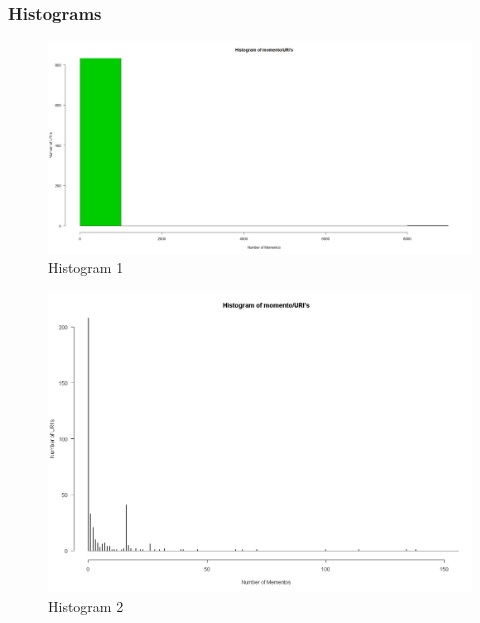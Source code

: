\subsubsection{Histograms}
\begin{figure}[ht]    
    \begin{center}
        \includegraphics[scale=0.27]{histgora_bscale.png}
        \caption{Histogram 1}
        \label{Histogram 1}
    \end{center}
\end{figure}
\begin{figure}[ht]    
    \begin{center}
        \includegraphics[scale=0.40]{histogram_mementos.png}
        \caption{Histogram 2}
        \label{Histogram 2}
    \end{center}
\end{figure}
\newpage
